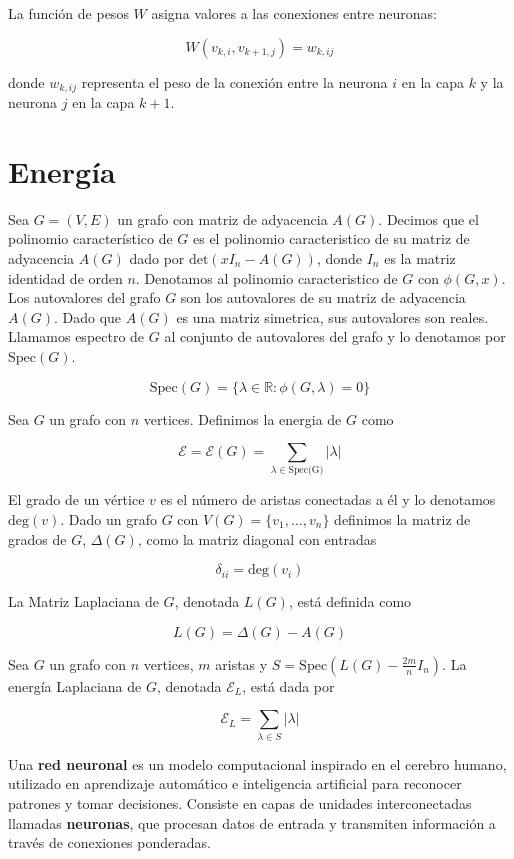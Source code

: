 \documentclass{article}
\begin{document}
La función de pesos \( W \) asigna valores a las conexiones entre neuronas:

\[
W(v_{k,i}, v_{k+1,j}) = w_{k,ij}
\]

donde \( w_{k,ij} \) representa el peso de la conexión entre la neurona \( i \) en la capa \( k \) y la neurona \( j \) en la capa \( k+1 \).

\section{Energía}

Sea $G = (V, E)$ un grafo con matriz de adyacencia $A(G)$. Decimos que el polinomio característico de $G$ es el polinomio caracteristico de su matriz de adyacencia $A(G)$ dado por $\text{det}(xI_n-A(G))$, donde $I_n$ es la matriz identidad de orden $n$. Denotamos al polinomio caracteristico de $G$ con $\phi(G, x)$. Los autovalores del grafo $G$ son los autovalores de su matriz de adyacencia $A(G)$. Dado que $A(G)$ es una matriz simetrica, sus autovalores son reales. Llamamos espectro de $G$ al conjunto de autovalores del grafo y lo denotamos por $\text{Spec}(G)$. 

$$\text{Spec}(G) = \lbrace \lambda \in \mathbb{R} : \phi(G, \lambda) = 0 \rbrace$$

Sea $G$ un grafo con $n$ vertices. Definimos la energia de $G$ como

$$\mathcal{E} = \mathcal{E}(G) = \sum_{\lambda \in \text{Spec(G)}} |\lambda|$$

El grado de un vértice $v$ es el número de aristas conectadas a él y lo denotamos $\text{deg}(v)$. Dado un grafo $G$ con $V(G) = \lbrace v_1, ... , v_n \rbrace$ definimos la matriz de grados de $G$, $\Delta(G)$, como la matriz diagonal con entradas

$$\delta_{ii} = \text{deg}(v_i)$$

La Matriz Laplaciana de $G$, denotada $L(G)$, está definida como

$$L(G) = \Delta(G) - A(G)$$

Sea $G$ un grafo con $n$ vertices, $m$ aristas y $S = \text{Spec}(L(G) - \frac{2m}{n}I_n)$. La energía Laplaciana de $G$, denotada $\mathcal{E}_L$, está dada por

$$\mathcal{E}_L = \sum_{\lambda \in S} |\lambda|$$

Una \textbf{red neuronal} es un modelo computacional inspirado en el cerebro humano, utilizado en aprendizaje automático e inteligencia artificial para reconocer patrones y tomar decisiones. Consiste en capas de unidades interconectadas llamadas \textbf{neuronas}, que procesan datos de entrada y transmiten información a través de conexiones ponderadas.
\end{document}
